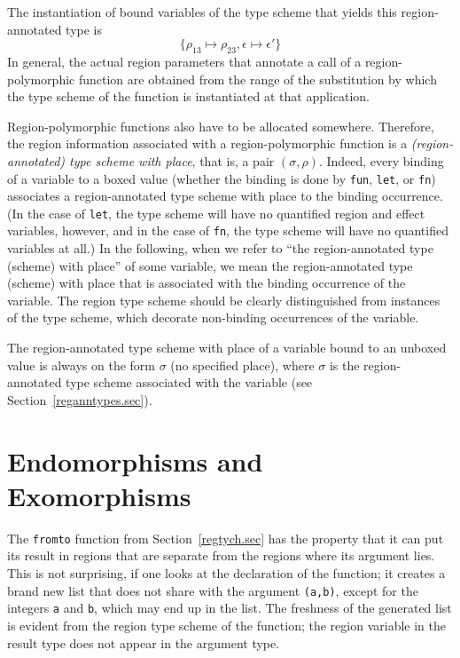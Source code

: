\documentclass[12pt]{book}
\begin{document}
The instantiation of bound variables of the type scheme that yields this
region-annotated type is
$$\{\rho_{13}\mapsto\rho_{23}, \epsilon\mapsto\epsilon'\}$$ In general, the
actual region parameters that annotate a call of a region-polymorphic function
are obtained from the range of the substitution by which the type scheme of the
function is instantiated at that application.

%
%
%
Region-polymorphic functions also have to be allocated somewhere.  Therefore,
the region information associated with a region-polymorphic function is a {\em
  (region-annotated) type scheme with place}, that is, a pair $(\sigma,\rho)$.
Indeed, every binding of a variable to a boxed value (whether the binding is
done by \lstinline{fun}, \lstinline{let}, or \lstinline{fn}) associates a
region-annotated type scheme with place to the binding occurrence.  (In the case
of \lstinline{let}, the type scheme will have no quantified region and effect
variables, however, and in the case of \lstinline{fn}, the type scheme will have
no quantified variables at all.)  In the following, when we refer to ``the
region-annotated type (scheme) with place'' of some variable, we mean the
region-annotated type (scheme) with place that is associated with the binding
occurrence of the variable. The region type scheme should be clearly
distinguished from instances of the type scheme, which decorate non-binding
occurrences of the variable.

The region-annotated type scheme with place of a variable bound to an unboxed
value is always on the form $\sigma$ (no specified place), where $\sigma$ is the
region-annotated type scheme associated with the variable (see
Section~\ref{reganntypes.sec}).

\section{Endomorphisms and Exomorphisms}

The \lstinline{fromto} function from Section~\ref{regtych.sec} has the property
that it can put its result in regions that are separate from the regions where
its argument lies. This is not surprising, if one looks at the declaration of
the function; it creates a brand new list that does not share with the argument
\lstinline{(a,b)}, except for the integers \lstinline{a} and \lstinline{b},
which may end up in the list.  The freshness of the generated list is evident
from the region type scheme of the function; the region variable in the result
type does not appear in the argument type.
\end{document}
